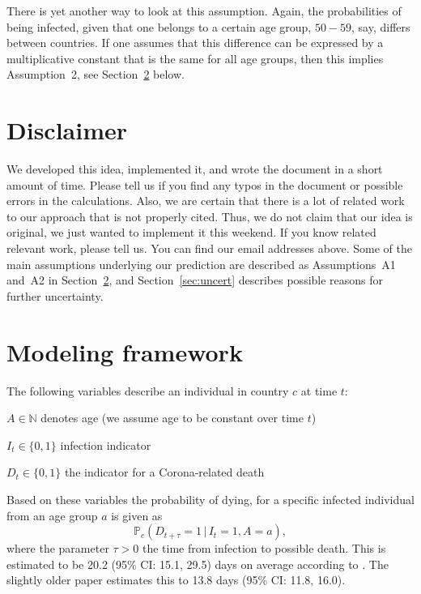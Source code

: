 \documentclass[a4paper]{article}
\newcommand\N{\mathbb{N}}
\renewcommand\P{\mathbb{P}}
\newcommand{\given}{\, \vert \,}
\begin{document}
There is yet another way to look at this assumption.
Again, the probabilities of 
being infected, given that one belongs to a certain age group, $50-59$, say, differs between countries. If one assumes
that this difference can be expressed by a multiplicative constant that is the same for all age groups, then 
this implies Assumption~2, see Section~\ref{sec:model} below.




\section{Disclaimer} \label{sec:disclaimer}

We 
developed this idea, implemented it, and 
wrote the 
document in a short amount of time. Please tell us if you find any typos 
in the document or possible errors in 
the calculations. 
Also, we are certain that there is a lot of 
related work to our approach that is not properly cited. 
Thus, we do not claim that our idea is original, we just wanted
to implement it this weekend.
If you know related relevant work, please tell us.
You can find our email addresses above.
Some of the main assumptions underlying our prediction are described 
as Assumptions~A1 and~A2 in Section~\ref{sec:model}, and
Section~\ref{sec:uncert} describes possible reasons for further uncertainty.


\section{Modeling framework} \label{sec:model}
The following variables describe an individual in country $c$ at time $t$:
\begin{compactitem}
\item $A \in \N$ denotes age (we assume age to be constant over time $t$)
\item $I_t \in \{0,1\}$ infection indicator
\item $D_t \in \{0,1\}$ the indicator for a Corona-related death
\end{compactitem}
Based on these variables the probability of dying, for a specific
infected individual from an age group $a$ is given as
\begin{equation*}
  \P_c(D_{t+\tau} = 1 \given I_t = 1, A = a), 
\end{equation*}
where the parameter $\tau > 0$ the time from infection to possible
death. This is estimated to be 20.2 (95\% CI: 15.1, 29.5) days on
average according to \citet{jung2020real}. The slightly older paper
\cite{linton2020epidemiological} estimates this to
13.8 days (95\% CI: 11.8, 16.0).
\end{document}
